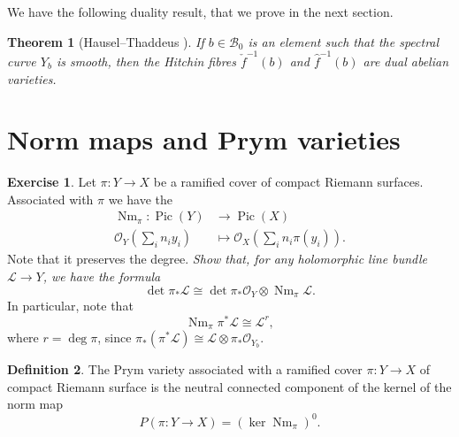 \documentclass[12pt,a4paper]{amsbook}
\newtheorem{thm}{Theorem}[chapter]
\theoremstyle{remark} \newtheorem{rmk}[thm]{Remark}
\theoremstyle{definition} \newtheorem{defn}[thm]{Definition}
\theoremstyle{definition} \newtheorem{ex}[thm]{Example}
\theoremstyle{definition} \newtheorem{ej}{Exercise}
\let\emph\relax
\newcommand{\cB}{\mathcal B}
\newcommand{\sO}{\mathscr O}
\newcommand{\sL}{\mathscr L}
\DeclareMathOperator{\Pic}{Pic}
\DeclareMathOperator{\Nm}{Nm}
\begin{document}
We have the following duality result, that we prove in the next section.

\begin{thm}[Hausel--Thaddeus \cite{HauselThaddeus}] \label{thm:duality}
If $b\in \cB_0$ is an element such that the spectral curve $Y_b$ is smooth, then the Hitchin fibres $\check{f}^{-1}(b)$ and $\hat{f}^{-1}(b)$ are dual abelian varieties.
\end{thm}

\section{Norm maps and Prym varieties}
\begin{ej}
  Let $\pi:Y\rightarrow X$ be a ramified cover of compact Riemann surfaces. Associated with $\pi$ we have the \emph{Norm map}
  \begin{align*}
    \Nm_\pi: \Pic(Y) & \longrightarrow \Pic(X) \\
      \sO_Y(\sum_i n_i y_i)& \longmapsto \sO_X(\sum_i n_i \pi(y_i)).
  \end{align*}
  Note that it preserves the degree.
\textit{Show that, for any holomorphic line bundle $\sL\rightarrow Y$, we have the formula}
\begin{equation*}
\det \pi_* \sL \cong \det \pi_* \sO_Y \otimes \Nm_\pi \sL.
\end{equation*}
In particular, note that
\begin{equation*}
\Nm_\pi \pi^* \sL \cong \sL^{r},
\end{equation*}
where $r=\deg \pi$, since $\pi_*(\pi^* \sL) \cong \sL \otimes \pi_* \sO_{Y_b}$.
\end{ej}

\begin{defn}
  The Prym variety associated with a ramified cover $\pi:Y\rightarrow X$ of compact Riemann surface is the neutral connected component of the kernel of the norm map
  \begin{equation*}
P(\pi:Y\rightarrow X) = (\ker \Nm_\pi)^0.
  \end{equation*}
\end{defn}
\end{document}
